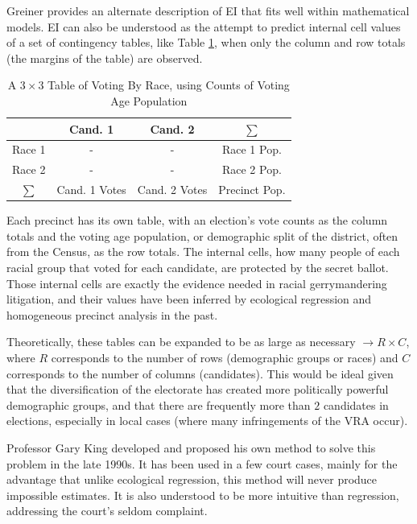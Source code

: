 \documentclass[fleqn,10pt]{style}
\begin{document}
Greiner provides an alternate description of EI that fits well within mathematical models.\cite{greiner} EI can also be understood as the attempt to predict internal cell values of a set of contingency tables, like Table \ref{table:ei_example}, when only the column and row totals (the margins of the table) are observed.

\begin{table}
 \centering
 \caption{A $3 \times 3$ Table of Voting By Race, using Counts of Voting Age Population}
 \label{table:ei_example}
 \begin{tabular}{cccc}\toprule
         & Cand. 1       & Cand. 2       & $\sum$        \\\midrule
  Race 1 &      -         &       -        & Race 1 Pop.   \\
  Race 2 &     -          &      -         & Race 2 Pop.   \\
  $\sum$ & Cand. 1 Votes & Cand. 2 Votes & Precinct Pop.
 \end{tabular}
\end{table}

Each precinct has its own table, with an election's vote counts as the column totals and the voting age population, or demographic split of the district, often from the Census, as the row totals. The internal cells, how many people of each racial group that voted for each candidate, are protected by the secret ballot. Those internal cells are exactly the evidence needed in racial gerrymandering litigation, and their values have been inferred by ecological regression and homogeneous precinct analysis in the past.

Theoretically, these tables can be expanded to be as large as necessary $\rightarrow R \times C$, where $R$ corresponds to the number of rows (demographic groups or races) and $C$ corresponds to the number of columns (candidates). This would be ideal given that the diversification of the electorate has created more politically powerful demographic groups, and that there are frequently more than $2$ candidates in elections, especially in local cases (where many infringements of the VRA occur).

Professor Gary King developed and proposed his own method to solve this problem in the late 1990s. It has been used in a few court cases, mainly for the advantage that unlike ecological regression, this method will never produce impossible estimates. It is also understood to be more intuitive than regression, addressing the court's seldom complaint.
\end{document}
